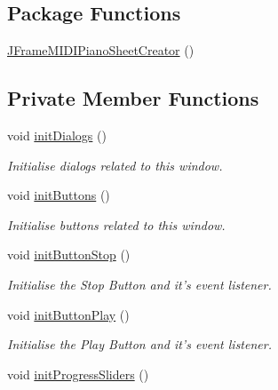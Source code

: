 \subsection*{Package Functions}
\begin{DoxyCompactItemize}
\item 
\hyperlink{classcom_1_1lclion_1_1midigui_1_1_j_frame_m_i_d_i_piano_sheet_creator_aa7344d98b77fcf456e4333719d4e4a34}{J\+Frame\+M\+I\+D\+I\+Piano\+Sheet\+Creator} ()
\end{DoxyCompactItemize}
\subsection*{Private Member Functions}
\begin{DoxyCompactItemize}
\item 
void \hyperlink{classcom_1_1lclion_1_1midigui_1_1_j_frame_m_i_d_i_piano_sheet_creator_a8512e0e195013a23bdecce9bfb93b04c}{init\+Dialogs} ()
\begin{DoxyCompactList}\small\item\em Initialise dialogs related to this window. \end{DoxyCompactList}\item 
void \hyperlink{classcom_1_1lclion_1_1midigui_1_1_j_frame_m_i_d_i_piano_sheet_creator_a27d3ba5afb772cc36c9a432c28975ace}{init\+Buttons} ()
\begin{DoxyCompactList}\small\item\em Initialise buttons related to this window. \end{DoxyCompactList}\item 
void \hyperlink{classcom_1_1lclion_1_1midigui_1_1_j_frame_m_i_d_i_piano_sheet_creator_a2f0269651e213406c54a93a303ef9154}{init\+Button\+Stop} ()
\begin{DoxyCompactList}\small\item\em Initialise the Stop Button and it's event listener. \end{DoxyCompactList}\item 
void \hyperlink{classcom_1_1lclion_1_1midigui_1_1_j_frame_m_i_d_i_piano_sheet_creator_a0251cff1964f088409b3bcb5811f4bc7}{init\+Button\+Play} ()
\begin{DoxyCompactList}\small\item\em Initialise the Play Button and it's event listener. \end{DoxyCompactList}\item 
void \hyperlink{classcom_1_1lclion_1_1midigui_1_1_j_frame_m_i_d_i_piano_sheet_creator_a64517851bfe923ade6f59648b3a9f4e3}{init\+Progress\+Sliders} ()

\end{DoxyCompactItemize}
